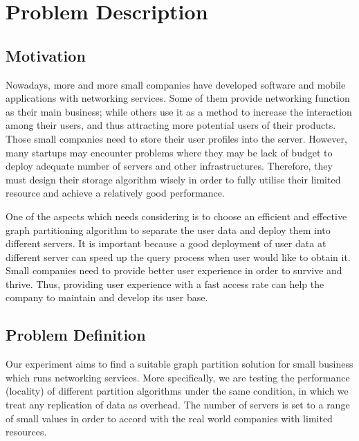 \section{Problem Description} \label{sec:sec2}


\subsection{Motivation}

Nowadays, more and more small companies have developed software and mobile applications with networking services. Some of them provide networking function as their main business; while others use it as a method to increase the interaction among their users, and thus attracting more potential users of their products. Those small companies need to store their user profiles into the server. However, many startups may encounter problems where they may be lack of budget to deploy adequate number of servers and other infrastructures. Therefore, they must design their storage algorithm wisely in order to fully utilise their limited resource and achieve a relatively good performance. 

One of the aspects which needs considering is to choose an efficient and effective graph partitioning algorithm to separate the user data and deploy them into different servers. It is important because a good deployment of user data at different server can speed up the query process when user would like to obtain it. Small companies need to provide better user experience in order to survive and thrive. Thus, providing user experience with a fast access rate can help the company to maintain and develop its user base.  

\subsection{Problem Definition}

Our experiment aims to find a suitable graph partition solution for small business which runs networking services. More specifically, we are testing the performance (locality) of different partition algorithms under the same condition, in which we treat any replication of data as overhead. The number of servers is set to a range of small values in order to accord with the real world companies with limited resources. 